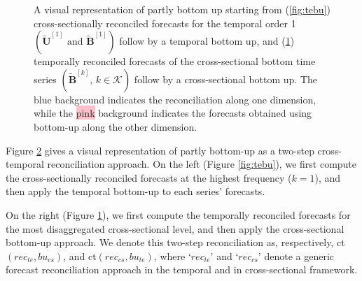 \documentclass[a4paper,11pt]{article}
\newcommand{\Bvet}{\bm{B}}
\newcommand{\Uvet}{\bm{U}}
\theoremstyle{definition}
\begin{document}
\begin{figure}[!b]
\begin{subfigure}[b]{0.49\textwidth}
{}
	\label{fig:csbu}
	\end{subfigure}
	\vspace{-1cm}
        \caption{A visual representation of partly bottom up starting from (\ref{fig:tebu}) cross-sectionally reconciled forecasts for the temporal order 1 $\left(\widetilde{\Uvet}^{[1]}\mbox{ and }\widetilde{\Bvet}^{[1]}\right)$ follow by a temporal bottom up, and (\ref{fig:csbu}) temporally reconciled forecasts of the cross-sectional bottom time series $\left(\widetilde{\Bvet}^{[k]}, \, k\in \mathcal{K}\right)$ follow by a cross-sectional bottom up. The \colorbox{mybluehl}{blue} background indicates the reconciliation along one dimension, while the \colorbox{pink}{pink} background indicates the forecasts obtained using bottom-up along the other dimension.}
        \label{fig:bigBU}
\end{figure}

Figure \ref{fig:bigBU} gives a visual representation of partly bottom-up as a two-step cross-temporal reconciliation approach. On the left (Figure \ref{fig:tebu}), we first compute the cross-sectionally reconciled forecasts at the highest frequency ($k = 1$), and then apply the temporal bottom-up to each series' forecasts.

On the right (Figure \ref{fig:csbu}), we first compute the temporally reconciled forecasts for the most disaggregated cross-sectional level, and then apply the cross-sectional bottom-up approach. We denote this two-step reconciliation as, respectively, ct$(rec_{te},bu_{cs})$, and ct$(rec_{cs},bu_{te})$, where ‘$rec_{te}$’ and ‘$rec_{cs}$’ denote a generic forecast reconciliation approach in the temporal and in cross-sectional framework.
\end{document}
